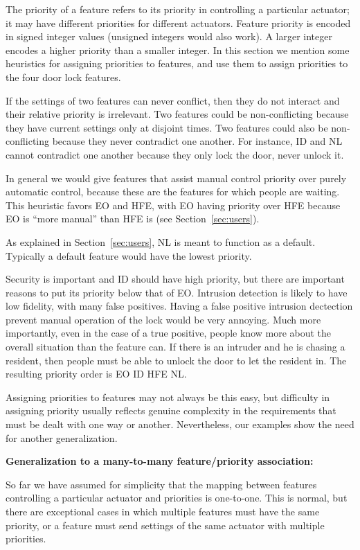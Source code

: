 \documentclass[conference]{IEEEtran}
\begin{document}
The priority of a feature refers to its priority in controlling a
particular actuator; it may have different priorities for different
actuators.
Feature priority is encoded in signed integer values (unsigned integers
would also work).
A larger integer encodes a higher priority than a smaller integer.
In this section we mention some heuristics for assigning priorities to
features, and use them to assign priorities to the four door lock
features.

If the settings of two features can never conflict, then they do not
interact and their relative priority is irrelevant.
Two features could be non-conflicting because they have current
settings only at disjoint times.
Two features could also be non-conflicting because they never contradict
one another.  
For instance, ID and NL cannot contradict one another because they
only lock the door, never unlock it.

In general we would give features that assist manual control priority
over purely automatic control, because these are
the features for which people are waiting.
This heuristic favors EO and HFE, with EO having priority over HFE because
EO is ``more manual'' than HFE is (see Section~\ref{sec:users}).

As explained in Section~\ref{sec:users}, NL is meant to function as a
default.
Typically a default feature would have the lowest priority.

Security is important and ID should have high priority, but there are
important reasons to put its priority below that of EO.
Intrusion detection is likely to have low fidelity,
with many false positives.
Having a false positive intrusion dectection
prevent manual operation of the lock
would be very annoying.
Much more importantly, even in the case of a true positive, people
know more about the overall situation than the feature can.
If there is an intruder and he 
is chasing a resident, then people must be able to unlock
the door to let the resident in.
The resulting priority order is EO  ID  HFE  NL.

Assigning priorities to features may not always be this easy, but
difficulty in assigning priority usually
reflects genuine complexity in the
requirements that must be dealt with one way or another.
Nevertheless, our examples show the need for another generalization.

\vspace{2mm}
{\bf Generalization to a many-to-many feature/priority association:}

So far we have assumed for simplicity that the mapping between features
controlling a particular actuator and 
priorities is one-to-one.
This is normal, but there are exceptional cases in which multiple features
must have the same priority, or a feature must send settings of the
same actuator with multiple priorities.
\end{document}

